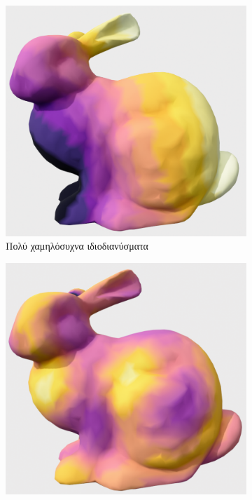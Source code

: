 \documentclass{article}
\begin{document}
\begin{figure}[h]
	\centering
	\begin{subfigure}{0.45\textwidth}
		\includegraphics[width=\textwidth]{"vl_freq.png"}
		\caption{Πολύ χαμηλόσυχνα ιδιοδιανύσματα}
		\label{fig:vis1}
	\end{subfigure}
	\begin{subfigure}{0.45\textwidth}
		\includegraphics[width=\textwidth]{"l_freq.png"}

\end{subfigure}
\end{figure}
\end{document}
